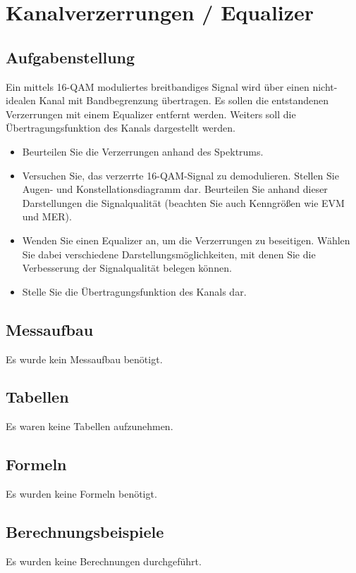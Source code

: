 \documentclass[12pt,a4paper,ngerman]{article}
\begin{document}
\pagebreak



\section{Kanalverzerrungen / Equalizer}
\subsection{Aufgabenstellung}
Ein mittels 16-QAM moduliertes breitbandiges Signal wird über einen nicht-idealen Kanal mit Bandbegrenzung übertragen. Es sollen die entstandenen Verzerrungen mit einem Equalizer entfernt werden. Weiters soll die Übertragungsfunktion des Kanals dargestellt werden. 
\begin{itemize}
\item Beurteilen Sie die Verzerrungen anhand des Spektrums.
\item Versuchen Sie, das verzerrte 16-QAM-Signal zu demodulieren. Stellen Sie Augen- und Konstellationsdiagramm dar. Beurteilen Sie anhand dieser Darstellungen die Signalqualität (beachten Sie auch Kenngrößen wie EVM und MER).
\item Wenden Sie einen Equalizer an, um die Verzerrungen zu beseitigen. Wählen Sie dabei verschiedene Darstellungsmöglichkeiten, mit denen Sie die Verbesserung der Signalqualität belegen können. 
\item Stelle Sie die Übertragungsfunktion des Kanals dar. 
\end{itemize}
\cite[18]{skript}

\subsection{Messaufbau}
Es wurde kein Messaufbau benötigt.
\subsection{Tabellen}
Es waren keine Tabellen aufzunehmen. 
\subsection{Formeln}
Es wurden keine Formeln benötigt.
\subsection{Berechnungsbeispiele}
Es wurden keine Berechnungen durchgeführt.

\pagebreak
\end{document}
